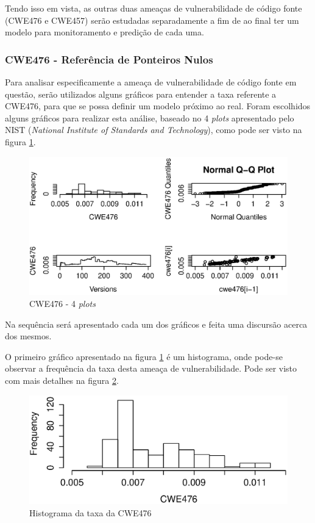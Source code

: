 Tendo isso em vista, as outras duas ameaças de vulnerabilidade de código fonte
(CWE476 e CWE457) serão estudadas separadamente a fim de ao final ter um modelo
para monitoramento e predição de cada uma.


\subsubsection{CWE476 - Referência de Ponteiros Nulos}

Para analisar especificamente a ameaça de vulnerabilidade de código fonte em
questão, serão utilizados alguns gráficos para entender a taxa referente a
CWE476, para que se possa definir um modelo próximo ao real. Foram escolhidos
alguns gráficos para realizar esta análise, baseado no 4 \textit{plots}
apresentado pelo NIST (\textit{National Institute of Standards and Technology}),
como pode ser visto na figura \ref{fig:cwe476-4-plot}.

\begin{figure}[h]
  \centering
  \includegraphics[width=1.0\textwidth]
      {figuras/cwe476-4-plot.eps}
      \caption{CWE476 - 4 \textit{plots}}
  \label{fig:cwe476-4-plot}
\end{figure}

Na sequência será apresentado cada um dos gráficos e feita uma discursão acerca
dos mesmos.

O primeiro gráfico apresentado na figura \ref{fig:cwe476-4-plot} é um
histograma, onde pode-se observar a frequência da taxa desta ameaça de
vulnerabilidade. Pode ser visto com mais detalhes na figura
\ref{fig:cwe476-hist}.

\begin{figure}[h]
  \centering
  \includegraphics[width=1.0\textwidth]
      {figuras/cwe476-hist.eps}
      \caption{Histograma da taxa da CWE476}
      \label{fig:cwe476-hist}
\end{figure}

